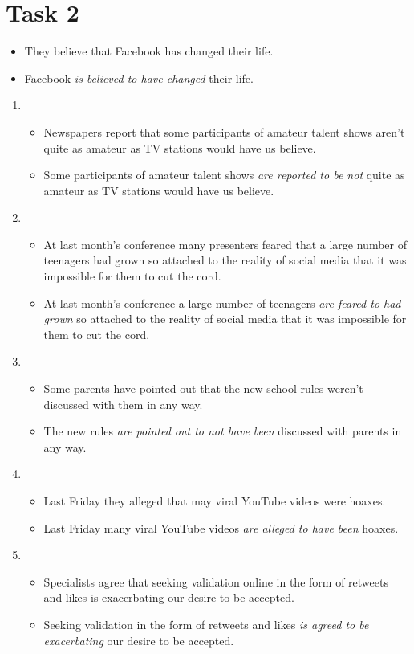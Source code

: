 \documentclass[a4paper]{article}
\begin{document}
\section{Task 2}
\begin{itemize}
    \item They believe that Facebook has changed their life.
    \item Facebook \emph{is believed to have changed} their life.
\end{itemize}
\begin{enumerate}
    \item \begin{itemize}
        \item Newspapers report that some participants of amateur talent shows aren't quite as amateur as TV stations would have us believe.
        \item Some participants of amateur talent shows \emph{are reported to be not} quite as amateur as TV stations would have us believe. 
    \end{itemize}
    \item \begin{itemize}
        \item At last month's conference many presenters feared that a large number of teenagers had grown so attached to the reality of social media that it was impossible for them to cut the cord.
        \item At last month's conference a large number of teenagers \emph{are feared to had grown} so attached to the reality of social media that it was impossible for them to cut the cord.
    \end{itemize}
    \item \begin{itemize}
        \item Some parents have pointed out that the new school rules weren't discussed with them in any way.
        \item The new rules \emph{are pointed out to not have been} discussed with parents in any way.
    \end{itemize}
    \item \begin{itemize}
        \item Last Friday they alleged that may viral YouTube videos were hoaxes.
        \item Last Friday many viral YouTube videos \emph{are alleged to have been} hoaxes.
    \end{itemize}
    \item \begin{itemize}
        \item Specialists agree that seeking validation online in the form of retweets and likes is exacerbating our desire to be accepted.
        \item Seeking validation in the form of retweets and likes \emph{is agreed to be exacerbating} our desire to be accepted.
    \end{itemize}
\end{enumerate}
\end{document}
